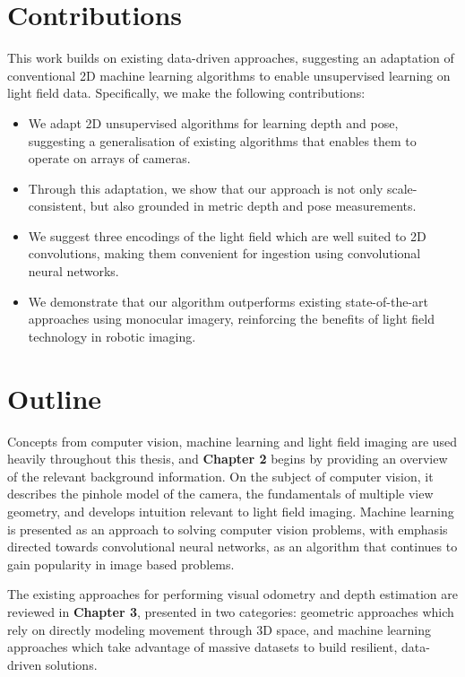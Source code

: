 \section{Contributions}
This work builds on existing data-driven approaches, suggesting an adaptation of conventional 2D machine learning algorithms to enable unsupervised learning on light field data. Specifically, we make the following contributions: 

\begin{itemize}
    \item We adapt 2D unsupervised algorithms for learning depth and pose, suggesting a generalisation of existing algorithms that enables them to operate on arrays of cameras.
    \item Through this adaptation, we show that our approach is not only scale-consistent, but also grounded in metric depth and pose measurements. 
    \item We suggest three encodings of the light field which are well suited to 2D convolutions, making them convenient for ingestion using convolutional neural networks. 
    \item We demonstrate that our algorithm outperforms existing state-of-the-art approaches using monocular imagery, reinforcing the benefits of light field technology in robotic imaging. 

\end{itemize}


\section{Outline}
Concepts from computer vision, machine learning and light field imaging are used heavily throughout this thesis, and \textbf{Chapter 2} begins by providing an overview of the relevant background information. On the subject of computer vision, it describes the pinhole model of the camera, the fundamentals of multiple view geometry, and develops intuition relevant to light field imaging. Machine learning is presented as an approach to solving computer vision problems, with emphasis directed towards convolutional neural networks, as an algorithm that continues to gain popularity in image based problems.

The existing approaches for performing visual odometry and depth estimation are reviewed in \textbf{Chapter 3}, presented in two categories: geometric approaches which rely on directly modeling movement through 3D space, and machine learning approaches which take advantage of massive datasets to build resilient, data-driven solutions.

